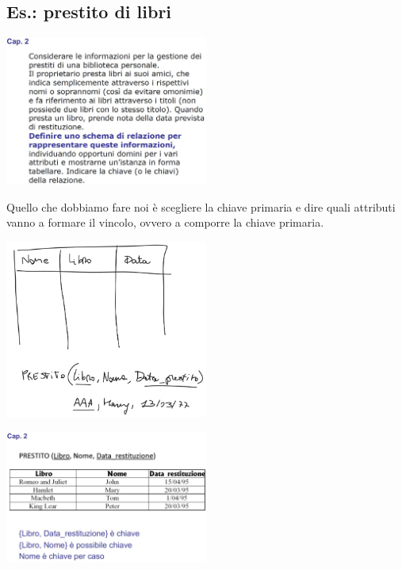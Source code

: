 \subsection{Es.: prestito di libri}
\begin{center}
    \includegraphics[width=0.5\textwidth]{chaptersLezioniSara/img/MR_es_prestitolibri1.jpg}
\end{center}
Quello che dobbiamo fare noi è scegliere la chiave primaria e dire quali attributi vanno a formare il vincolo, ovvero a comporre la chiave primaria.
\begin{center}
    \includegraphics[width=0.5\textwidth]{chaptersLezioniSara/img/MR_es_prestitolibri2.jpg}
\end{center}
\begin{center}
    \includegraphics[width=0.5\textwidth]{chaptersLezioniSara/img/MR_es_prestitolibri3.jpg} 
\end{center}

